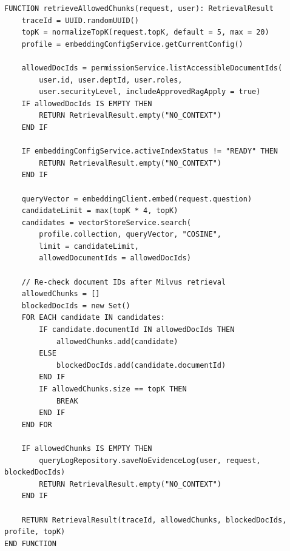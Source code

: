 \begin{table}[H]
\centering
\caption{Pseudocode --- retrieveAllowedChunks() Evidence-Aware Vector Retrieval}
\label{tab:pseudocode-rag-retrieve}
\vspace{2mm}

\begin{lstlisting}
FUNCTION retrieveAllowedChunks(request, user): RetrievalResult
    traceId = UUID.randomUUID()
    topK = normalizeTopK(request.topK, default = 5, max = 20)
    profile = embeddingConfigService.getCurrentConfig()

    allowedDocIds = permissionService.listAccessibleDocumentIds(
        user.id, user.deptId, user.roles,
        user.securityLevel, includeApprovedRagApply = true)
    IF allowedDocIds IS EMPTY THEN
        RETURN RetrievalResult.empty("NO_CONTEXT")
    END IF

    IF embeddingConfigService.activeIndexStatus != "READY" THEN
        RETURN RetrievalResult.empty("NO_CONTEXT")
    END IF

    queryVector = embeddingClient.embed(request.question)
    candidateLimit = max(topK * 4, topK)
    candidates = vectorStoreService.search(
        profile.collection, queryVector, "COSINE",
        limit = candidateLimit,
        allowedDocumentIds = allowedDocIds)

    // Re-check document IDs after Milvus retrieval
    allowedChunks = []
    blockedDocIds = new Set()
    FOR EACH candidate IN candidates:
        IF candidate.documentId IN allowedDocIds THEN
            allowedChunks.add(candidate)
        ELSE
            blockedDocIds.add(candidate.documentId)
        END IF
        IF allowedChunks.size == topK THEN
            BREAK
        END IF
    END FOR

    IF allowedChunks IS EMPTY THEN
        queryLogRepository.saveNoEvidenceLog(user, request, blockedDocIds)
        RETURN RetrievalResult.empty("NO_CONTEXT")
    END IF

    RETURN RetrievalResult(traceId, allowedChunks, blockedDocIds, profile, topK)
END FUNCTION
\end{lstlisting}
\end{table}

\vspace{3mm}
\needspace{0.52\textheight}

